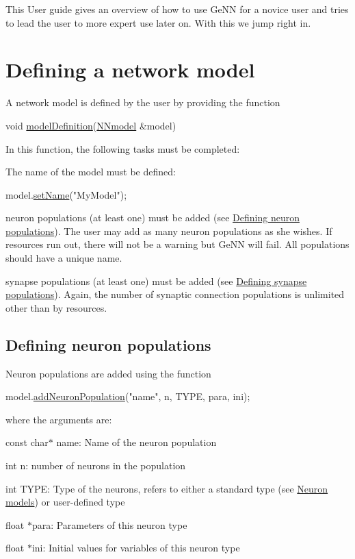 This User guide gives an overview of how to use Ge\+N\+N for a novice user and tries to lead the user to more expert use later on. With this we jump right in.\hypertarget{Manual_sect1}{}\section{Defining a network model}\label{Manual_sect1}
A network model is defined by the user by providing the function 
\begin{DoxyCode}
\textcolor{keywordtype}{void} \hyperlink{tmp_2model_2MBody__userdef_8cc_a9aeaa0a22980484b2c472564fc9f686e}{modelDefinition}(\hyperlink{classNNmodel}{NNmodel} &model) 
\end{DoxyCode}
 In this function, the following tasks must be completed\+:
\begin{DoxyItemize}
\item The name of the model must be defined\+: 
\begin{DoxyCode}
model.\hyperlink{classNNmodel_a757eff2a5877688e6e5492726df035ee}{setName}(\textcolor{stringliteral}{"MyModel"});
\end{DoxyCode}

\item neuron populations (at least one) must be added (see \hyperlink{Manual_subsect11}{Defining neuron populations}). The user may add as many neuron populations as she wishes. If resources run out, there will not be a warning but Ge\+N\+N will fail. All populations should have a unique name.
\item synapse populations (at least one) must be added (see \hyperlink{Manual_subsect12}{Defining synapse populations}). Again, the number of synaptic connection populations is unlimited other than by resources.
\end{DoxyItemize}\hypertarget{Manual_subsect11}{}\subsection{Defining neuron populations}\label{Manual_subsect11}
Neuron populations are added using the function 
\begin{DoxyCode}
model.\hyperlink{classNNmodel_a24532739d3ae98da3e00a9fe5aadd54e}{addNeuronPopulation}(\textcolor{stringliteral}{"name"}, n, TYPE, para, ini);
\end{DoxyCode}
 where the arguments are\+: \begin{DoxyItemize}
\item {\ttfamily const} {\ttfamily char$\ast$} name\+: Name of the neuron population \item {\ttfamily int} n\+: number of neurons in the population \item {\ttfamily int} T\+Y\+P\+E\+: Type of the neurons, refers to either a standard type (see \hyperlink{Manual_sect2}{Neuron models}) or user-\/defined type \item {\ttfamily float} $\ast$para\+: Parameters of this neuron type \item {\ttfamily float} $\ast$ini\+: Initial values for variables of this neuron type\end{DoxyItemize}
